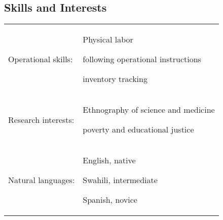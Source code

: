\subsection{Skills and Interests}
\tabulinesep =0.9mm
\baselineskip
\begin{longtabu} to \linewidth{X[3]X[10]}
    Operational skills: &
        \begin{itemize*}[itemjoin={{;\ }}, label=, afterlabel=,]
            \item Physical labor
            \item following operational instructions
            \item inventory tracking
        \end{itemize*}\\
    Research interests: &
        \begin{itemize*}[itemjoin={{;\ }}, label=, afterlabel=,]
            \item Ethnography of science and medicine
            \item poverty and educational justice
        \end{itemize*}\\
    Natural languages: &
        \begin{itemize*}[itemjoin={{;\ }}, label=, afterlabel=,]
            \item English, native
            \item Swahili, intermediate
            \item Spanish, novice
        \end{itemize*}\\

\end{longtabu}
